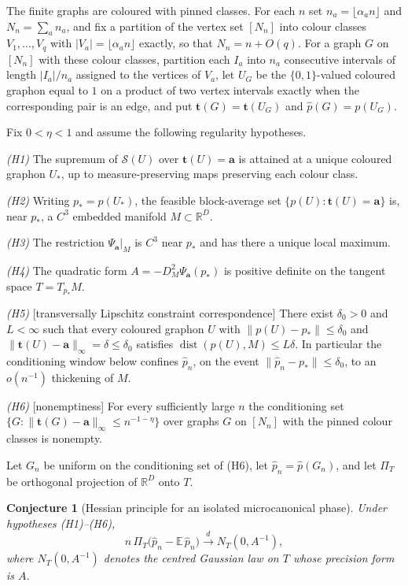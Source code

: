 \documentclass[11pt]{article}
\newtheorem{conjecture}{Conjecture}
\theoremstyle{definition}
\newcommand{\E}{\mathbb E}
\newcommand{\R}{\mathbb R}
\providecommand{\R}{\mathbb R}
\providecommand{\E}{\mathbb E}
\begin{document}
The finite graphs are coloured with pinned classes.  For each $n$ set
$n_a=\lfloor\alpha_an\rfloor$ and $N_n=\sum_an_a$, and fix a partition
of the vertex set $[N_n]$ into colour classes $V_1,\ldots,V_q$ with
$|V_a|=\lfloor\alpha_an\rfloor$ exactly, so that $N_n=n+O(q)$.  For a
graph $G$ on $[N_n]$ with these colour classes, partition each $I_a$
into $n_a$ consecutive intervals of length $|I_a|/n_a$ assigned to the
vertices of $V_a$, let $U_G$ be the $\{0,1\}$-valued coloured graphon
equal to $1$ on a product of two vertex intervals exactly when the
corresponding pair is an edge, and put
$\mathbf t(G)=\mathbf t(U_G)$ and $\widehat p(G)=p(U_G)$.

Fix $0<\eta<1$ and assume the following regularity hypotheses.

\emph{(H1)} The supremum of $\mathcal S(U)$ over
$\mathbf t(U)=\mathbf a$ is attained at a unique coloured graphon
$U_*$, up to measure-preserving maps preserving each colour class.

\emph{(H2)} Writing $p_*=p(U_*)$, the feasible block-average set
$\{p(U):\mathbf t(U)=\mathbf a\}$ is, near $p_*$, a $C^3$ embedded
manifold $M\subset\R^D$.

\emph{(H3)} The restriction $\Psi_{\mathbf a}|_M$ is $C^3$ near $p_*$
and has there a unique local maximum.

\emph{(H4)} The quadratic form $A=-D^2_M\Psi_{\mathbf a}(p_*)$ is
positive definite on the tangent space $T=T_{p_*}M$.

\emph{(H5)} \textup{[transversally Lipschitz constraint
correspondence]}  There exist $\delta_0>0$ and $L<\infty$ such that
every coloured graphon $U$ with $\|p(U)-p_*\|\le\delta_0$ and
$\|\mathbf t(U)-\mathbf a\|_\infty=\delta\le\delta_0$ satisfies
$\operatorname{dist}(p(U),M)\le L\delta$.  In particular the
conditioning window below confines $\widehat p_n$, on the event
$\|\widehat p_n-p_*\|\le\delta_0$, to an $o(n^{-1})$ thickening of
$M$.

\emph{(H6)} \textup{[nonemptiness]}  For every sufficiently large $n$
the conditioning set
$\{G:\|\mathbf t(G)-\mathbf a\|_\infty\le n^{-1-\eta}\}$ over graphs
$G$ on $[N_n]$ with the pinned colour classes is nonempty.

Let $G_n$ be uniform on the conditioning set of (H6), let $\widehat p_n=\widehat p(G_n)$, and let $\Pi_T$ be orthogonal
projection of $\R^D$ onto $T$.

\begin{conjecture}[Hessian principle for an isolated microcanonical phase]\label{t4}
Under hypotheses \textup{(H1)--(H6)},
\[
n\,\Pi_T\bigl(\widehat p_n-\E\,\widehat p_n\bigr)
\xrightarrow{\ d\ }
N_T(0,A^{-1}),
\]
where $N_T(0,A^{-1})$ denotes the centred Gaussian law on $T$ whose
precision form is $A$.
\end{conjecture}
\end{document}
